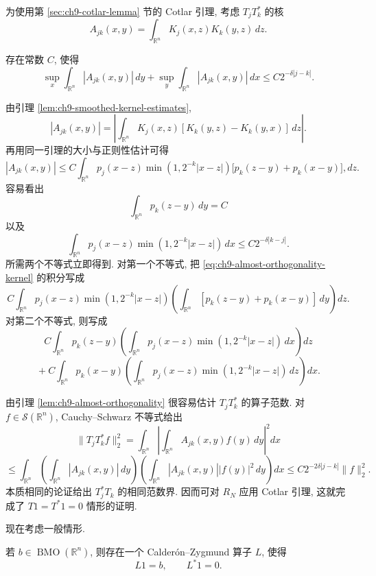 \hypertarget{chapter-09-page-220}{}

为使用第 \ref{sec:ch9-cotlar-lemma} 节的 Cotlar 引理, 考虑 $T_jT_k^*$ 的核
\[
 A_{jk}(x,y)=\int_{\mathbb R^n}K_j(x,z)K_k(y,z)\,dz.
\]

\hypertarget{chapter-09-page-221}{}

\begin{Lemma}
\label{lem:ch9-almost-orthogonality}
存在常数 $C$, 使得
\[
 \sup_x\int_{\mathbb R^n}|A_{jk}(x,y)|\,dy
 +\sup_y\int_{\mathbb R^n}|A_{jk}(x,y)|\,dx
 \leq C2^{-\delta|j-k|}.
\]
\end{Lemma}

\begin{Proof}
由引理 \ref{lem:ch9-smoothed-kernel-estimates},
\[
 |A_{jk}(x,y)|
 =\left|\int_{\mathbb R^n}K_j(x,z)[K_k(y,z)-K_k(y,x)]\,dz\right|.
\]
再用同一引理的大小与正则性估计可得
\begin{equation}
\label{eq:ch9-almost-orthogonality-kernel}
 |A_{jk}(x,y)|\leq C\int_{\mathbb R^n}p_j(x-z)
 \min(1,2^{-k}|x-z|)\bigl[p_k(z-y)+p_k(x-y)\bigr],dz.
\tag{9.8}
\end{equation}
容易看出
\[
 \int_{\mathbb R^n}p_k(z-y)\,dy=C
\]
以及
\[
 \int_{\mathbb R^n}p_j(x-z)\min(1,2^{-k}|x-z|)\,dx
 \leq C2^{-\delta|k-j|}.
\]
所需两个不等式立即得到. 对第一个不等式, 把 \eqref{eq:ch9-almost-orthogonality-kernel} 的积分写成
\[
 C\int_{\mathbb R^n}p_j(x-z)\min(1,2^{-k}|x-z|)
 \left(\int_{\mathbb R^n}[p_k(z-y)+p_k(x-y)]\,dy\right)dz.
\]
对第二个不等式, 则写成
\[
 C\int_{\mathbb R^n}p_k(z-y)
 \left(\int_{\mathbb R^n}p_j(x-z)\min(1,2^{-k}|x-z|)\,dx\right)dz
\]
\[
 {}+C\int_{\mathbb R^n}p_k(x-y)
 \left(\int_{\mathbb R^n}p_j(x-z)\min(1,2^{-k}|x-z|)\,dz\right)dx.
\]
\end{Proof}

由引理 \ref{lem:ch9-almost-orthogonality} 很容易估计 $T_jT_k^*$ 的算子范数. 对 $f\in\mathcal S(\mathbb R^n)$, Cauchy--Schwarz 不等式给出
\[
 \|T_jT_k^*f\|_2^2
 =\int_{\mathbb R^n}\left|\int_{\mathbb R^n}A_{jk}(x,y)f(y)\,dy\right|^2dx
\]
\[
 \leq\int_{\mathbb R^n}\left(\int_{\mathbb R^n}|A_{jk}(x,y)|\,dy\right)
 \left(\int_{\mathbb R^n}|A_{jk}(x,y)||f(y)|^2\,dy\right)dx
 \leq C2^{-2\delta|j-k|}\|f\|_2^2.
\]
本质相同的论证给出 $T_j^*T_k$ 的相同范数界. 因而可对 $R_N$ 应用 Cotlar 引理, 这就完成了 $T1=T^*1=0$ 情形的证明.

\hypertarget{chapter-09-page-222}{}

现在考虑一般情形.

\begin{Lemma}
\label{lem:ch9-paraproduct-construction}
若 $b\in\operatorname{BMO}(\mathbb R^n)$, 则存在一个 Calderón--Zygmund 算子 $L$, 使得
\[
 L1=b,\qquad L^*1=0.
\]
\end{Lemma}

